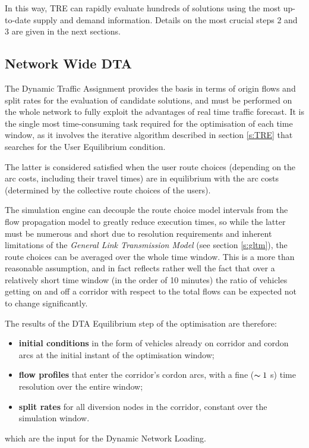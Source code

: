 In this way, TRE can rapidly evaluate hundreds of solutions using the most up-to-date supply and demand information. Details on the most crucial steps 2 and 3 are given in the next sections.

\subsection{Network Wide DTA}
The Dynamic Traffic Assignment provides the basis in terms of origin flows and split rates for the evaluation of candidate solutions, and must be performed on the whole network to fully exploit the advantages of real time traffic forecast. It is the single most time-consuming task required for the optimisation of each time window, as it involves the iterative algorithm described in section \ref{s:TRE} that searches for the User Equilibrium condition.

The latter is considered satisfied when the user route choices (depending on the arc costs, including their travel times) are in equilibrium with the arc costs (determined by the collective route choices of the users). 

The simulation engine can decouple the route choice model intervals from the flow propagation model to greatly reduce execution times, so while the latter must be numerous and short due to resolution requirements and inherent limitations of the \emph{General Link Transmission Model} (see section \ref{s:gltm}), the route choices can be averaged over the whole time window. This is a more than reasonable assumption, and in fact reflects rather well the fact that over a relatively short time window (in the order of 10 minutes) the ratio of vehicles getting on and off a corridor with respect to the total flows can be expected not to change significantly.

The results of the DTA Equilibrium step of the optimisation are therefore:
\begin{itemize}
\item \textbf{initial conditions} in the form of vehicles already on corridor and cordon arcs at the initial instant of the optimisation window;
\item \textbf{flow profiles} that enter the corridor's cordon arcs, with a fine ($\thicksim 1$ s) time resolution over the entire window;
\item \textbf{split rates} for all diversion nodes in the corridor, constant over the simulation window.
\end{itemize} 
which are the input for the Dynamic Network Loading.


